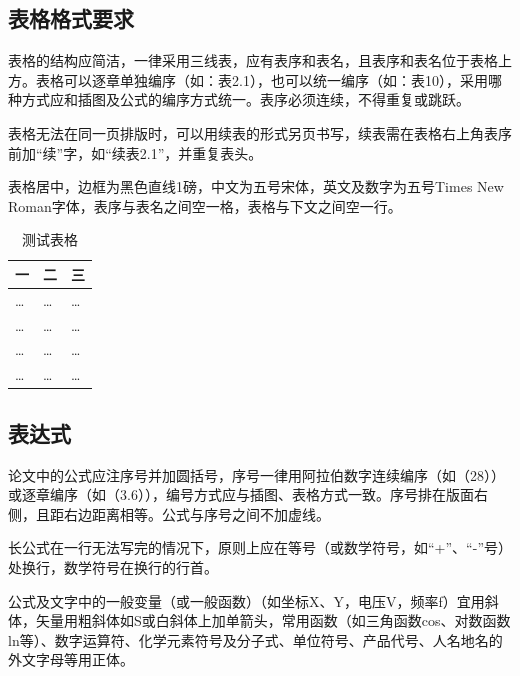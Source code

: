 \begin{spacing}{1.5}
    \subsection{表格格式要求}
    
    表格的结构应简洁，一律采用三线表，应有表序和表名，且表序和表名位于表格上方。表格可以逐章单独编序（如：表2.1），也可以统一编序（如：表10），采用哪种方式应和插图及公式的编序方式统一。表序必须连续，不得重复或跳跃。
    
    表格无法在同一页排版时，可以用续表的形式另页书写，续表需在表格右上角表序前加“续”字，如“续表2.1”，并重复表头。
    
    表格居中，边框为黑色直线1磅，中文为五号宋体，英文及数字为五号Times New Roman字体，表序与表名之间空一格，表格与下文之间空一行。
    
    
    \begin{table}
        \begin{center}
            \caption{测试表格}
            \begin{tabular}[c]{w{c}{0.3\linewidth}w{c}{0.3\linewidth}w{c}{0.3\linewidth}}
                \hline
                一 & 二 & 三\\
                \hline
                \ldots & \ldots &\ldots\\
                \ldots & \ldots &\ldots\\
                \ldots & \ldots &\ldots\\
                \ldots & \ldots &\ldots\\
                \hline
            \end{tabular}
        \end{center}
    \end{table}
    
    \subsection{表达式}
    
    论文中的公式应注序号并加圆括号，序号一律用阿拉伯数字连续编序（如（28））或逐章编序（如（3.6）），编号方式应与插图、表格方式一致。序号排在版面右侧，且距右边距离相等。公式与序号之间不加虚线。
    
    长公式在一行无法写完的情况下，原则上应在等号（或数学符号，如“+”、“-”号）处换行，数学符号在换行的行首。
    
    公式及文字中的一般变量（或一般函数）（如坐标X、Y，电压V，频率f）宜用斜体，矢量用粗斜体如S或白斜体上加单箭头，常用函数（如三角函数cos、对数函数ln等）、数字运算符、化学元素符号及分子式、单位符号、产品代号、人名地名的外文字母等用正体。
    

\end{spacing}
